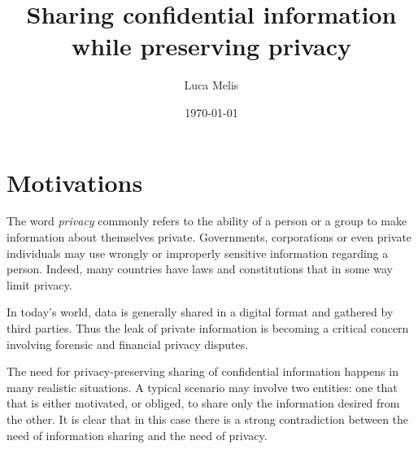 \documentclass[dvips,12pt]{article}
\begin{document}
\title{Sharing confidential information while preserving privacy}
\author{Luca Melis}
\date{\today}



\maketitle
\section{Motivations}
The word \emph{privacy} commonly refers to the ability of a person or a group to make information about themselves private. Governments, corporations or even private individuals may use wrongly or improperly sensitive information regarding a person. Indeed, many countries have laws and constitutions that in some way limit privacy.


In today's world, data is generally shared in a digital format and gathered by third parties.
Thus the leak of private information is becoming a critical concern involving forensic and financial privacy disputes.
   
The need for privacy-preserving sharing of confidential information happens in many realistic situations.
A typical scenario may involve two entities: one that that is either motivated, or obliged, to share only the information desired from the other.
It is clear that in this case there is a strong contradiction between the need of information sharing and the need of privacy.
\end{document}
